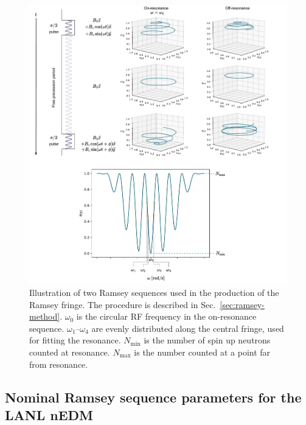 \begin{figure}[htp]
    \centering
    \includegraphics[width=\textwidth]{figures/ramsey_sequence.pdf}
    \caption[Illustration of two Ramsey sequences used in the production of the Ramsey fringe. The procedure is described in Sec.~\ref{sec:ramsey-method}]
    {Illustration of two Ramsey sequences used in the production of the Ramsey fringe. The procedure is described in Sec.~\ref{sec:ramsey-method}. $\omega_0$ is the circular RF frequency in the on-resonance sequence. $\omega_1$--$\omega_4$ are evenly distributed along the central fringe, used for fitting the resonance. $N_\text{min}$ is the number of spin up neutrons counted at resonance. $N_\text{max}$ is the number counted at a point far from resonance.}
    \label{fig:ramsey-sequence}
\end{figure}


\subsection{Nominal Ramsey sequence parameters for the LANL nEDM}\label{sec:LANL_nEDM_ramsey_params}


